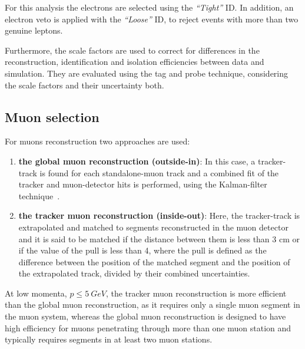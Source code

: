 For this analysis the electrons are selected using the {\em ``Tight''} ID. In addition, an electron veto is applied with the {\em ``Loose''} ID, to reject events with more than two genuine leptons. 

Furthermore, the scale factors are used to correct for differences in the reconstruction, identification and isolation efficiencies between data and simulation. They are evaluated using the tag and probe technique, considering the scale factors and their uncertainty both.
 

\subsection{Muon selection}
For muons reconstruction two approaches are used:
\begin{enumerate}
  \item \textbf{the global muon reconstruction (outside-in)}: In this case, a tracker-track is found for each standalone-muon track and a combined fit of the tracker and muon-detector hits is performed, using the Kalman-filter technique~\cite{Kalman1960,Fruehwirth1987}.
  \item \textbf{the tracker muon reconstruction (inside-out)}: Here, the tracker-track is extrapolated and matched to segments reconstructed in the muon detector and it is said to be matched if the distance between them is less than 3 cm or if the value of the pull is less than 4, where the pull is defined as the difference between the position of the matched segment and the position of the extrapolated track, divided by their combined uncertainties.
\end{enumerate}

At low momenta, $p \leq 5 ~GeV$, the tracker muon reconstruction is more efficient than the global muon reconstruction, as it requires only a single muon segment in the muon system, whereas the global muon reconstruction is designed to have high efficiency for muons penetrating through more than one muon station and typically requires segments in at least two muon stations.

